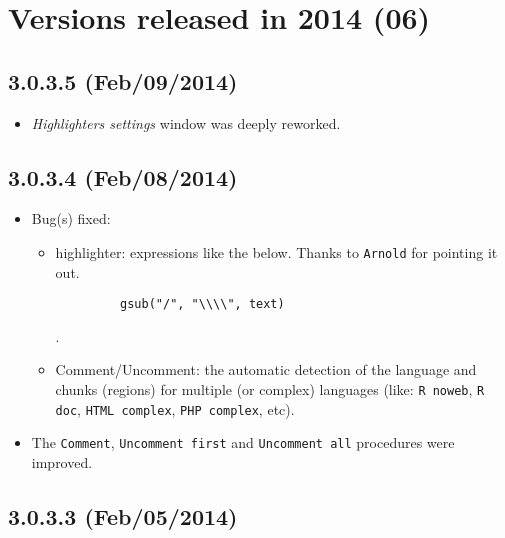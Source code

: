
\hypertarget{2014}{}
\section{Versions released in 2014 (06)}

\subsection*{3.0.3.5 (Feb/09/2014)}
\begin{itemize}
  \item \textit{Highlighters settings} window was deeply reworked.
\end{itemize}


\subsection*{3.0.3.4 (Feb/08/2014)}
\begin{itemize}
  \item Bug(s) fixed:
    \begin{itemize}
      \item \RR{} highlighter: expressions like the below. Thanks to \texttt{Arnold} for pointing it out.
       \begin{verbatim}
         gsub("/", "\\\\", text)
       \end{verbatim}.
      \item Comment/Uncomment: the automatic detection of the language and chunks (regions) for multiple (or complex) languages
       (like: \texttt{R noweb}, \texttt{R doc}, \texttt{HTML complex}, \texttt{PHP complex}, etc).
    \end{itemize}
  \item The \texttt{Comment}, \texttt{Uncomment first} and \texttt{Uncomment all}
   procedures were improved.
\end{itemize}


\subsection*{3.0.3.3 (Feb/05/2014)}


